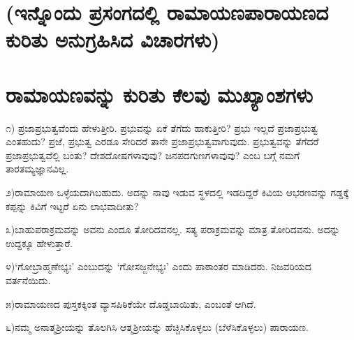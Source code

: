 \section*{(ಇನ್ನೊಂದು ಪ್ರಸಂಗದಲ್ಲಿ ರಾಮಾಯಣಪಾರಾಯಣದ ಕುರಿತು ಅನುಗ್ರಹಿಸಿದ ವಿಚಾರಗಳು)}

\section*{ರಾಮಾಯಣವನ್ನು ಕುರಿತು ಕೆಲವು ಮುಖ್ಯಾಂಶಗಳು}

೧) ಪ್ರಜಾಪ್ರಭುತ್ವವೆಂದು ಹೇಳುತ್ತೀರಿ. ಪ್ರಭುವನ್ನು ಏಕೆ ತೆಗೆದು ಹಾಕುತ್ತೀರಿ? ಪ್ರಭು ಇಲ್ಲದೆ ಪ್ರಜಾಪ್ರಭುತ್ವ ಎಂತಹುದು? ಪ್ರಜೆ, ಪ್ರಭುತ್ವ ಎರಡೂ ಸೇರಿದರೆ ತಾನೇ ಪ್ರಜಾಪ್ರಭುತ್ವವಾಗುವುದು. ಪ್ರಭುತ್ವವನ್ನು ತೆಗೆದರೆ ಪ್ರಜಾಪ್ರಭುತ್ವವೆಲ್ಲಿ ಬಂತು? ದೇಶದೋಷಗಳಾವುವು? ಜನಪದಗುಣಗಳಾವುವು? ಎಂಬ ಬಗ್ಗೆ ನಮಗೆ ತಾರತಮ್ಯಜ್ಞಾನವಿಲ್ಲ. 

೨)ರಾಮಾಯಣ ಒಳ್ಳೆಯದಾಗಿಬಹುದು. ಅದನ್ನು ನಾವು ಇಡುವ ಸ್ಥಳದಲ್ಲಿ ಇಡದಿದ್ದರೆ ಕಿವಿಯ ಆಭರಣವನ್ನು ಗಡ್ಡಕ್ಕೆ ಕಪ್ಪನ್ನು ಕಿವಿಗೆ ಇಟ್ಟರೆ ಏನು ಲಾಭವಾದೀತು?  

೩)ಬಾಹುಪರಾಕ್ರಮವನ್ನು ಅವನು ಎಂದೂ ತೋರಿದವನಲ್ಲ. ಸತ್ಯ ಪರಾಕ್ರಮವನ್ನು ಮಾತ್ರ ತೋರಿದವನು. ಅದನ್ನು ಉದ್ದಕ್ಕೂ ಹೇಳುತ್ತಾರೆ.

೪)`ಗೋಬ್ರಾಹ್ಮಣೇಭ್ಯಃ' ಎಂಬುದನ್ನು `ಗೋಸಜ್ಜನೇಭ್ಯಃ' ಎಂದು ಪಾಠಾಂತರ ಮಾಡಿದರು. ನಿಜವರಿಯದ ವರ್ತನೆಯಿದು.

೫)ರಾಮಾಯಣದ ಪುಸ್ತಕಕ್ಕಿಂತ ವ್ಯಾಸಪಿಠಿಕೆಯೇ ದೊಡ್ಡಬಾಯಿತು, ಎಂಬಂತೆ ಆಗಿದೆ. 

೬)ನಮ್ಮ ಅನಾತ್ಮಶ್ರೀಯನ್ನು ತೊಲಗಿಸಿ ಆತ್ಮಶ್ರೀಯನ್ನು ಹೆಚ್ಚಿಸಿಕೊಳ್ಳಲು (ಬೆಳೆಸಿಕೊಳ್ಳಲು) ಪಾರಾಯಣ. 
